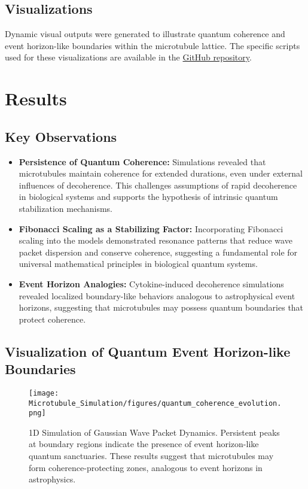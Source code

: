 \documentclass[entropy,article,submit,oneauthor,pdftex,]{Definitions/mdpi}
\begin{document}
\subsection{Visualizations}
Dynamic visual outputs were generated to illustrate quantum coherence and event horizon-like boundaries within the microtubule lattice. The specific scripts used for these visualizations are available in the \href{https://github.com/TheonlyqueenAC/Microtubule_Simulation}{GitHub repository}.
\section{Results}
\subsection{Key Observations}
\begin{itemize}
    \item \textbf{Persistence of Quantum Coherence:} Simulations revealed that microtubules maintain coherence for extended durations, even under external influences of decoherence. This challenges assumptions of rapid decoherence in biological systems and supports the hypothesis of intrinsic quantum stabilization mechanisms.
    \item \textbf{Fibonacci Scaling as a Stabilizing Factor:} Incorporating Fibonacci scaling into the models demonstrated resonance patterns that reduce wave packet dispersion and conserve coherence, suggesting a fundamental role for universal mathematical principles in biological quantum systems.
    \item \textbf{Event Horizon Analogies:} Cytokine-induced decoherence simulations revealed localized boundary-like behaviors analogous to astrophysical event horizons, suggesting that microtubules may possess quantum boundaries that protect coherence.
\end{itemize}
\subsection{Visualization of Quantum Event Horizon-like Boundaries}
\begin{figure}[H]
    \centering
    \texttt{[image: Microtubule\_Simulation/figures/quantum\_coherence\_evolution.png]}
    \caption{1D Simulation of Gaussian Wave Packet Dynamics. Persistent peaks at boundary regions indicate the presence of event horizon-like quantum sanctuaries. These results suggest that microtubules may form coherence-protecting zones, analogous to event horizons in astrophysics.}
    \label{fig:event_horizon}
\end{figure}
\end{document}
